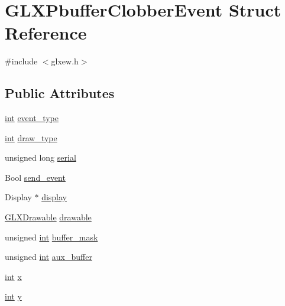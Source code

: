 \hypertarget{struct_g_l_x_pbuffer_clobber_event}{\section{G\-L\-X\-Pbuffer\-Clobber\-Event Struct Reference}
\label{struct_g_l_x_pbuffer_clobber_event}
}


{\ttfamily \#include $<$glxew.\-h$>$}

\subsection*{Public Attributes}
\begin{DoxyCompactItemize}
\item 
\hyperlink{_s_d_l__thread_8h_a6a64f9be4433e4de6e2f2f548cf3c08e}{int} \hyperlink{struct_g_l_x_pbuffer_clobber_event_a30d7162d8d77246b01f5e610cda4da68}{event\-\_\-type}
\item 
\hyperlink{_s_d_l__thread_8h_a6a64f9be4433e4de6e2f2f548cf3c08e}{int} \hyperlink{struct_g_l_x_pbuffer_clobber_event_a243f92b79d3cfbde73eab02815be2320}{draw\-\_\-type}
\item 
unsigned long \hyperlink{struct_g_l_x_pbuffer_clobber_event_a6390b2875ae06a4cb827d2b4c321eda3}{serial}
\item 
Bool \hyperlink{struct_g_l_x_pbuffer_clobber_event_aa51969e67e4ad6095bda26ca64fe8ba6}{send\-\_\-event}
\item 
Display $\ast$ \hyperlink{struct_g_l_x_pbuffer_clobber_event_acd3002489b74d3b9eca2b7be33f08211}{display}
\item 
\hyperlink{_g_l_e_w_2glxew_8h_a826f51745d9d6c81bdbac47ae2b80cf7}{G\-L\-X\-Drawable} \hyperlink{struct_g_l_x_pbuffer_clobber_event_a388908b766e35205c1a461ea8b60439f}{drawable}
\item 
unsigned \hyperlink{_s_d_l__thread_8h_a6a64f9be4433e4de6e2f2f548cf3c08e}{int} \hyperlink{struct_g_l_x_pbuffer_clobber_event_aff4c23d00f6dad98427f8d32a5f10580}{buffer\-\_\-mask}
\item 
unsigned \hyperlink{_s_d_l__thread_8h_a6a64f9be4433e4de6e2f2f548cf3c08e}{int} \hyperlink{struct_g_l_x_pbuffer_clobber_event_a13193b6e7e3e52b15f754fe91403b7ec}{aux\-\_\-buffer}
\item 
\hyperlink{_s_d_l__thread_8h_a6a64f9be4433e4de6e2f2f548cf3c08e}{int} \hyperlink{struct_g_l_x_pbuffer_clobber_event_a8f0a7162a033c89ee94ce535580dbc32}{x}
\item 
\hyperlink{_s_d_l__thread_8h_a6a64f9be4433e4de6e2f2f548cf3c08e}{int} \hyperlink{struct_g_l_x_pbuffer_clobber_event_a69eb7ac60d36ac3ec4550ac206cfc61f}{y}

\end{DoxyCompactItemize}
